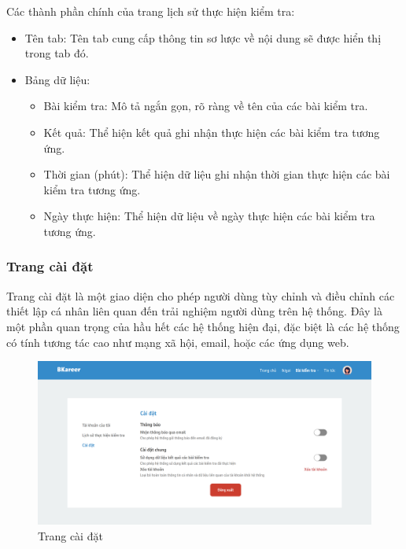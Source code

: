 Các thành phần chính của trang lịch sử thực hiện kiểm tra:
\begin{itemize}
    \item Tên tab: Tên tab cung cấp thông tin sơ lược về nội dung sẽ được hiển thị trong tab đó.
    \item Bảng dữ liệu:
        \begin{itemize}
            \item Bài kiểm tra: Mô tả ngắn gọn, rõ ràng về tên của các bài kiểm tra.
            \item Kết quả: Thể hiện kết quả ghi nhận thực hiện các bài kiểm tra tương ứng.
            \item Thời gian (phút): Thể hiện dữ liệu ghi nhận thời gian thực hiện các bài kiểm tra tương ứng.
            \item Ngày thực hiện: Thể hiện dữ liệu về ngày thực hiện các bài kiểm tra tương ứng.
        \end{itemize}
\end{itemize}


\subsubsection{Trang cài đặt}
Trang cài đặt là một giao diện cho phép người dùng tùy chỉnh và điều chỉnh các thiết lập cá nhân liên quan đến trải nghiệm người dùng trên hệ thống. Đây là một phần quan trọng của hầu hết các hệ thống hiện đại, đặc biệt là các hệ thống có tính tương tác cao như mạng xã hội, email, hoặc các ứng dụng web.

\begin{figure}[H]
    \centering
    \includegraphics[width=0.8\linewidth]{images/chap5/profile-Setting.png}
    \vspace{0.5cm}
    \caption{Trang cài đặt}
\end{figure}

